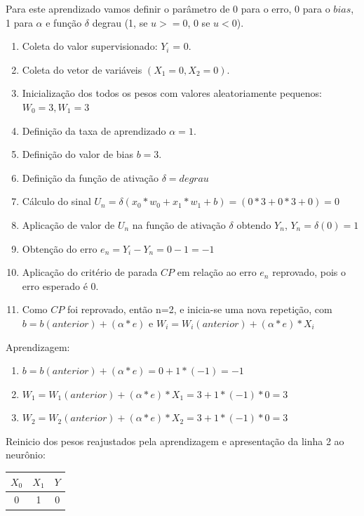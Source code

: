 \documentclass[	12pt, Times, openright, twoside, a4paper, english, brazil]{abntex2}
\begin{document}
  			 	Para este aprendizado vamos definir o parâmetro de 0 para o erro, 0 para o $bias$, 1 para $\alpha$ e função $\delta$ degrau (1, se $u>=0$, 0 se $u<0$).
  			 	
	  			 \begin{enumerate}
	  			 	\item Coleta do valor supervisionado: $Y_i$ = 0.
	  			 	\item Coleta do vetor de variáveis $(X_1 = 0, X_2=0)$.
	  			 	\item Inicialização dos todos os pesos com valores aleatoriamente pequenos: $W_0=3,W_1=3$
	  			 	\item Definição da taxa de aprendizado $\alpha = 1$.
	  			 	\item Definição do valor de bias $b=3$.
	  			 	\item Definição da função de ativação $\delta = degrau$  
	  			 	\item Cálculo do sinal $U_n = \delta(x_0*w_0 + x_1*w_1 +b) = (0*3+0*3+0) = 0$
	  			 	\item Aplicação de valor de $U_n$ na função de ativação $\delta$ obtendo $Y_n$, $Y_n = \delta(0) = 1$
	  			 	\item Obtenção do erro $e_n = Y_i-Y_n = 0 - 1 = -1$
	  			 	\item Aplicação do critério de parada $CP$ em relação ao erro $e_n$ reprovado, pois o erro esperado é 0.
	  			 	\item Como $CP$ foi reprovado, então n=2, e inicia-se uma nova repetição, com $b=b(anterior)+(\alpha*e)$ e $W_i=W_i(anterior) + (\alpha*e)*X_i$
	  			 \end{enumerate}		
  				
  				Aprendizagem:
  				\begin{enumerate}
  					\item $b=b(anterior)+(\alpha*e) = 0 + 1*(-1) = -1 $  					
  					\item $W_1=W_1(anterior) + (\alpha*e)*X_1 = 3 + 1*(-1)*0 = 3$
  					\item $W_2=W_2(anterior) + (\alpha*e)*X_2 = 3 + 1*(-1)*0 = 3$
  				\end{enumerate}	
  				
  				Reinicio dos pesos reajustados pela aprendizagem e apresentação da linha 2 ao neurônio:
  				
  				\begin{tabular}{|c|c|c|}
  					\hline  \textbf{$X_0$} & \textbf{$X_1$} &  \textbf{$Y$}\\
  					\hline 0 & 1 & 0\\
  				\end{tabular}
  				
\end{document}

